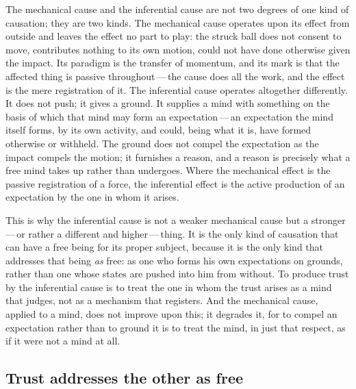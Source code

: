 The mechanical cause and the inferential cause are not two degrees of one kind of causation; they are two kinds. The mechanical cause operates upon its effect from outside and leaves the effect no part to play: the struck ball does not consent to move, contributes nothing to its own motion, could not have done otherwise given the impact. Its paradigm is the transfer of momentum, and its mark is that the affected thing is passive throughout\,---\,the cause does all the work, and the effect is the mere registration of it. The inferential cause operates altogether differently. It does not push; it gives a ground. It supplies a mind with something on the basis of which that mind may form an expectation\,---\,an expectation the mind itself forms, by its own activity, and could, being what it is, have formed otherwise or withheld. The ground does not compel the expectation as the impact compels the motion; it furnishes a reason, and a reason is precisely what a free mind takes up rather than undergoes. Where the mechanical effect is the passive registration of a force, the inferential effect is the active production of an expectation by the one in whom it arises.

This is why the inferential cause is not a weaker mechanical cause but a stronger\,---\,or rather a different and higher\,---\,thing. It is the only kind of causation that can have a free being for its proper subject, because it is the only kind that addresses that being \emph{as} free: as one who forms his own expectations on grounds, rather than one whose states are pushed into him from without. To produce trust by the inferential cause is to treat the one in whom the trust arises as a mind that judges, not as a mechanism that registers. And the mechanical cause, applied to a mind, does not improve upon this; it degrades it, for to compel an expectation rather than to ground it is to treat the mind, in just that respect, as if it were not a mind at all.

\subsection{Trust addresses the other as free}
\label{p13:sub:free-asfree}

